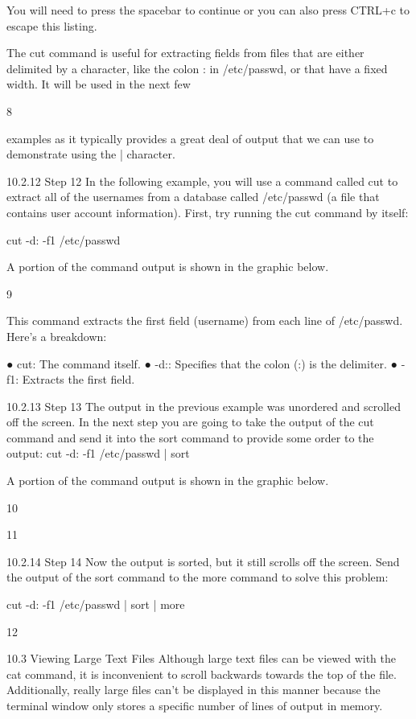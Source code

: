 You will need to press the spacebar to continue or you can also press CTRL+c to escape this
listing.

The cut command is useful for extracting fields from files that are either delimited by a character,
like the colon : in /etc/passwd, or that have a fixed width. It will be used in the next few

8



examples as it typically provides a great deal of output that we can use to demonstrate using the
| character.

10.2.12 Step 12
In the following example, you will use a command called cut to extract all of the usernames from
a database called /etc/passwd (a file that contains user account information). First, try running
the cut command by itself:

cut -d: -f1 /etc/passwd

A portion of the command output is shown in the graphic below.

9



This command extracts the first field (username) from each line of /etc/passwd. Here's a
breakdown:

● cut: The command itself.
● -d:: Specifies that the colon (:) is the delimiter.
● -f1: Extracts the first field.

10.2.13 Step 13
The output in the previous example was unordered and scrolled off the screen. In the next step
you are going to take the output of the cut command and send it into the sort command to
provide some order to the output:
cut -d: -f1 /etc/passwd | sort

A portion of the command output is shown in the graphic below.

10



11



10.2.14 Step 14
Now the output is sorted, but it still scrolls off the screen. Send the output of the sort command
to the more command to solve this problem:

cut -d: -f1 /etc/passwd | sort | more

12



10.3 Viewing Large Text Files
Although large text files can be viewed with the cat command, it is inconvenient to scroll
backwards towards the top of the file. Additionally, really large files can't be displayed in this
manner because the terminal window only stores a specific number of lines of output in memory.

